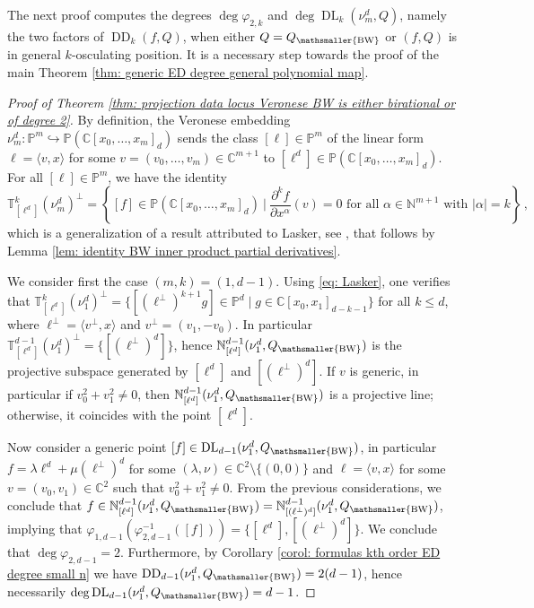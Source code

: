 \documentclass[11pt,reqno]{amsart}
\numberwithin{equation}{section}
\theoremstyle{plain}
\numberwithin{theorem}{section}
\theoremstyle{definition}
\newcommand{\N}{\mathbb{N}}
\renewcommand{\P}{\mathbb{P}}
\newcommand{\C}{\mathbb{C}}
\newcommand{\T}{\mathbb{T}}
\newcommand{\DL}{\operatorname{DL}}
\newcommand{\DD}{\operatorname{DD}}
\newcommand{\mBW}{\mathsmaller{\mathrm{BW}}}
\begin{document}
The next proof computes the degrees $\deg\varphi_{2,k}$ and $\deg\DL_k(\nu_m^d,Q)$, namely the two factors of $\DD_k(f,Q)$, when either $Q=Q_\mBW$ or $(f,Q)$ is in general $k$-osculating position. It is a necessary step towards the proof of the main Theorem \ref{thm: generic ED degree general polynomial map}.

\begin{proof}[Proof of Theorem \ref{thm: projection data locus Veronese BW is either birational or of degree 2}]
By definition, the Veronese embedding $\nu_m^d\colon\P^m\hookrightarrow\P(\C[x_0,\dots,x_m]_d)$ sends the class $[\ell]\in\P^m$ of the linear form $\ell=\langle v,x\rangle$ for some $v=(v_0,\dots,v_m)\in\C^{m+1}$ to $[\ell^d]\in\P(\C[x_0,\dots,x_m]_d)$. For all $[\ell]\in\P^m$, we have the identity
\begin{equation}\label{eq: Lasker}
\T_{[\ell^d]}^k(\nu_m^d)^\perp = \left\{[f]\in\P(\C[x_0,\dots,x_m]_d)\ \bigg|\ \text{$\frac{\partial^k f}{\partial x^\alpha}(v)=0$ for all $\alpha\in\N^{m+1}$ with $|\alpha|=k$}\right\}\,,
\end{equation}
which is a generalization of a result attributed to Lasker, see \cite[\S1.2, Proposition 1]{ottaviani2013five}, that follows by Lemma \ref{lem: identity BW inner product partial derivatives}.

We consider first the case $(m,k)=(1,d-1)$. Using \eqref{eq: Lasker}, one verifies that $\T_{[\ell^d]}^k(\nu_1^d)^\perp=\{[(\ell^\perp)^{k+1}g]\in\P^d\mid g\in\C[x_0,x_1]_{d-k-1}\}$ for all $k\le d$, where $\ell^\perp = \langle v^\perp,x\rangle$ and $v^\perp=(v_1,-v_0)$. In particular $\T_{[\ell^d]}^{d-1}(\nu_1^d)^\perp=\{[(\ell^\perp)^d]\}$, hence $\N_{[\ell^d]}^{d-1}(\nu_1^d,Q_\mBW)$ is the projective subspace generated by $[\ell^d]$ and $[(\ell^\perp)^d]$. If $v$ is generic, in particular if $v_0^2+v_1^2\neq 0$, then $\N_{[\ell^d]}^{d-1}(\nu_1^d,Q_\mBW)$ is a projective line; otherwise, it coincides with the point $[\ell^d]$.

Now consider a generic point $[f]\in\DL_{d-1}(\nu_1^d,Q_\mBW)$, in particular $f=\lambda\ell^d+\mu(\ell^\perp)^d$ for some $(\lambda,\nu)\in\C^2\setminus\{(0,0)\}$ and $\ell=\langle v,x\rangle$ for some $v=(v_0,v_1)\in\C^2$ such that $v_0^2+v_1^2\neq 0$. From the previous considerations, we conclude that $f\in \N_{[\ell^d]}^{d-1}(\nu_1^d,Q_\mBW)=\N_{[(\ell^\perp)^d]}^{d-1}(\nu_1^d,Q_\mBW)$, implying that $\varphi_{1,d-1}(\varphi_{2,d-1}^{-1}([f]))=\{[\ell^d],[(\ell^\perp)^d]\}$. We conclude that $\deg\varphi_{2,d-1}=2$. Furthermore, by Corollary \ref{corol: formulas kth order ED degree small n} we have $\DD_{d-1}(\nu_1^d,Q_\mBW)=2(d-1)$, hence necessarily $\deg\DL_{d-1}(\nu_1^d,Q_\mBW)=d-1$.


\end{proof}
\end{document}
